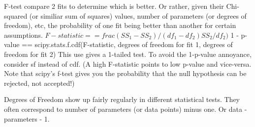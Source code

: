 \documentclass{slides}
\begin{document}
\newpage
F-test
compare 2 fits to determine which is better. Or rather, given their Chi-squared (or similiar sum of squares) values, number of parameters (or degrees of freedom), etc, the probability of one fit being better than another for certain assumptions.
$F-statistic == frac{(SS_1 - SS_2)/(df_1-df_2)}{SS_2/df_2)}$
1 - p-value == scipy.stats.f.cdf(F-statistic, degrees of freedom for fit 1, degrees of freedom for fit 2)
This use gives a 1-tailed test. To avoid the 1-p-value annoyance, consider sf instead of cdf.
(A high F-statistic points to low p-value and vice-versa. Note that scipy's f-test gives you the probability that the null hypothesis can be rejected, not accepted!)

Degrees of Freedom show up fairly regularly in different statistical tests. They often correspond to number of parameters (or data points) minus one. Or data - parameters - 1.
\end{document}
